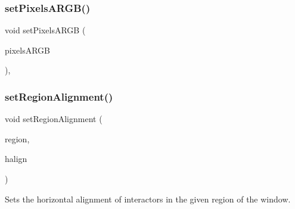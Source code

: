 \mbox{\label{classGForwardDrawingSurface_a64dd4bc93e7f6555e9d96b956602c7c8}} 
\subsubsection{\texorpdfstring{set\+Pixels\+A\+R\+G\+B()}{setPixelsARGB()}}
{\footnotesize\ttfamily void set\+Pixels\+A\+R\+GB (\begin{DoxyParamCaption}\item[{const \mbox{\hyperlink{classGrid}{Grid}}$<$ int $>$ \&}]{pixels\+A\+R\+GB }\end{DoxyParamCaption})\hspace{0.3cm}{\ttfamily [virtual]}, {\ttfamily [inherited]}}

\mbox{\label{classGWindow_a96e9f5593c0193bbdc7ae99945b9cf5f}} 
\subsubsection{\texorpdfstring{set\+Region\+Alignment()}{setRegionAlignment()}\hspace{0.1cm}{\footnotesize\ttfamily [1/5]}}
{\footnotesize\ttfamily void set\+Region\+Alignment (\begin{DoxyParamCaption}\item[{\mbox{\hyperlink{classGWindow_a81a01a86de31071a92e6cce0bab9bc4b}{Region}}}]{region,  }\item[{Horizontal\+Alignment}]{halign }\end{DoxyParamCaption})\hspace{0.3cm}{\ttfamily [virtual]}}



Sets the horizontal alignment of interactors in the given region of the window. 

\mbox{\label{classGWindow_a926942899d029fc9921fe770ac2867bb}} 
